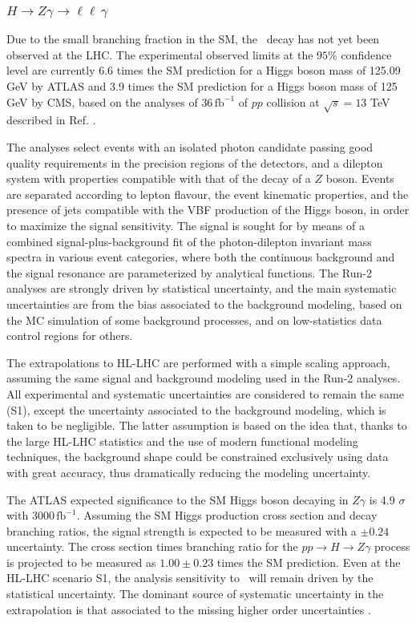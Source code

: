 \subsubsection{$H \to Z\gamma \to \ell\ell\,\gamma$}

Due to the small branching fraction in the SM, the \HZy\ decay has not yet been observed at the LHC. The experimental observed limits at the $95\%$ confidence level are currently 6.6 times the SM prediction for a Higgs boson mass of 125.09 GeV by ATLAS and 3.9 times the SM prediction for a Higgs boson mass of 125 GeV by CMS, based on the analyses of 36\,$\mathrm{fb}^{-1}$ of $pp$ collision at $\sqrt{s} = 13$ TeV described in Ref. \cite{Aaboud:2017uhw, Sirunyan:2018tbk}.

The analyses select events with an isolated photon candidate passing good quality requirements in the precision regions of the detectors, and a dilepton system with properties compatible with that of the decay of a $Z$ boson. Events are separated according to lepton flavour, the event kinematic properties, and the presence of jets compatible with the VBF production of the Higgs boson, in order to maximize the signal sensitivity. The signal is sought for by means of a combined signal-plus-background fit of the photon-dilepton invariant mass spectra in various event categories, where both the continuous background and the signal resonance are parameterized by analytical functions. The Run-2 analyses are strongly driven by statistical uncertainty, and the main systematic uncertainties are from the bias associated to the background modeling, based on the MC simulation of some background processes, and on low-statistics data control regions for others.

The extrapolations to HL-LHC are performed with a simple scaling approach, assuming the same signal and background modeling used in the Run-2 analyses. All experimental and systematic uncertainties are considered to remain the same (S1), except the uncertainty associated to the background modeling, which is taken to be negligible. The latter assumption is based on the idea that, thanks to the large HL-LHC statistics and the use of modern functional modeling techniques, the background shape could be constrained exclusively using data with great accuracy, thus dramatically reducing the modeling uncertainty.

The ATLAS expected significance to the SM Higgs boson decaying in $Z\gamma$ is 4.9 $\sigma$ with 3000\,$\mathrm{fb}^{-1}$. Assuming the SM Higgs production cross section and decay branching ratios, the signal strength is expected to be measured with a $\pm0.24$ uncertainty. The cross section times branching ratio for the $pp\rightarrow H \rightarrow Z\gamma$ process is projected to be measured as $1.00\pm0.23$ times the SM prediction. Even at the HL-LHC scenario S1, the analysis sensitivity  to \HZy\ will remain driven by the statistical uncertainty. The dominant source of systematic uncertainty in the extrapolation is that associated to the 
missing higher order uncertainties \cite{ATL-PHYS-PUB-2018-054}.

